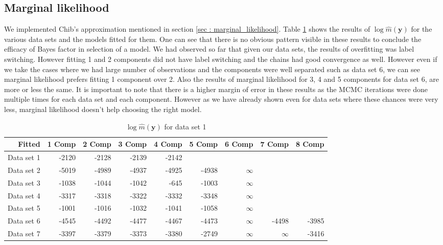 \subsection{Marginal likelihood}
\label{subsec : marginal_likelihood_simulation}
We implemented Chib's approximation mentioned in section \ref{sec : marginal_likelihood}. Table \ref{table : marginal_likelihood_results} shows the results of $\log{\hat{m}(\boldsymbol{y})}$ for the various data sets and the models fitted for them. One can see that there is no obvious pattern visible in these results to conclude the efficacy of Bayes factor in selection of a model. We had observed so far that given our data sets, the results of overfitting was label switching. However fitting 1 and 2 components did not have label switching and the chains had good convergence as well. However even if we take the cases where we had large number of observations and the components were well separated such as data set 6, we can see marginal likelihood prefers fitting 1 component over 2. Also the results of marginal likelihood for 3, 4 and 5 components for data set 6, are more or less the same. It is important to note that there is a higher margin of error in these results as the MCMC iterations were done multiple times for each data set and each component. However as we have already shown even for data sets where these chances were very less, marginal likelihood doesn't help choosing the right model.

\begin{table}[!htb]
\centering
\caption{$\log{\hat{m}(\boldsymbol{y})}$ for data set 1}
\label{table : marginal_likelihood_results} 
\begin{tabular}{rrrrrrrrr}
\toprule
Fitted & 1 Comp & 2 Comp & 3 Comp & 4 Comp & 5 Comp & 6 Comp & 7 Comp & 8 Comp \\\midrule
Data set 1 & -2120 & -2128 & -2139 & -2142 &  &  &  &  \\
Data set 2 & -5019 & -4989 & -4937 & -4925 & -4938 & $\infty$ &  &  \\
Data set 3 & -1038 & -1044 & -1042 & -645 & -1003 & $\infty$ &  &  \\
Data set 4 & -3317 & -3318 & -3322 & -3332 & -3348 & $\infty$ &  &  \\
Data set 5 & -1001 & -1016 & -1032 & -1041 & -1058 & $\infty$ &  &  \\
Data set 6 & -4545 & -4492 & -4477 & -4467 & -4473 & $\infty$ & -4498 & -3985 \\
Data set 7 & -3397 & -3379 & -3373 & -3380 & -2749 & $\infty$ & $\infty$ & -3416 \\ \bottomrule
\end{tabular}
\end{table}

